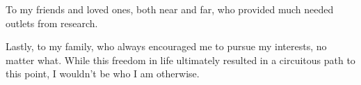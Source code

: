 To my friends and loved ones, both near and far, who provided much needed outlets from research.

Lastly, to my family, who always encouraged me to pursue my interests, no matter what. While this freedom in life ultimately resulted in a circuitous path to this point, I wouldn't be who I am otherwise.

%
%
%
